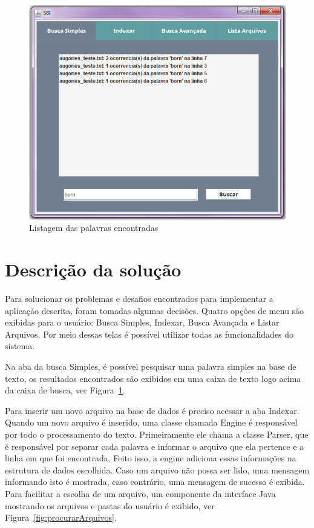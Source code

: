 \documentclass[12pt]{article}
\begin{document}
\begin{figure}[!htb]
\centering
\includegraphics[width=.87\textwidth]{img/tela1-preenchida.png}
\caption{Listagem das palavras encontradas}
\label{fig:formatoListagem}
\end{figure}

\section{Descrição da solução}
 
 Para solucionar os problemas e desafios encontrados para implementar a aplicação descrita, foram tomadas algumas decisões. Quatro opções de menu são exibidas para o usuário: Busca Simples, Indexar, Busca Avançada e Listar Arquivos. Por meio dessas telas é possível utilizar todas as funcionalidades do sistema. 
 
Na aba da busca Simples, é possível pesquisar uma palavra simples na base de texto, os resultados encontrados são exibidos em uma caixa de texto logo acima da caixa de busca, ver Figura~\ref{fig:formatoListagem}.

Para inserir um novo arquivo na base de dados é preciso acessar a aba Indexar. Quando um novo arquivo é inserido, uma classe chamada Engine é responsável por todo o processamento do texto. Primeiramente ele chama a classe Parser, que é responsável por separar cada palavra e informar o arquivo que ela pertence e a linha em que foi encontrada. Feito isso, a engine adiciona essas informações na estrutura de dados escolhida. Caso um arquivo não possa ser lido, uma mensagem informando isto é mostrada, caso contrário, uma mensagem de sucesso é exibida. Para facilitar a escolha de um arquivo, um componente da interface Java mostrando os arquivos e pastas do usuário é exibido, ver Figura~\ref{fig:procurarArquivos}. 
\end{document}
